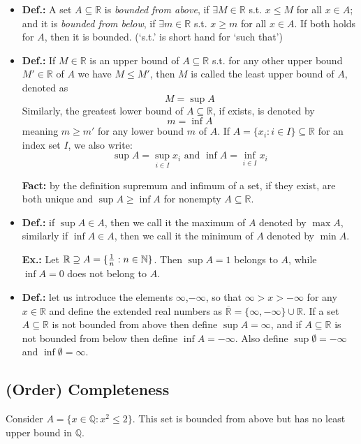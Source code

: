 \documentclass{article}
\begin{document}
\begin{itemize}
\item \textbf{Def.:} A set $A\subseteq \mathbb{R}$ is \textit{bounded} \textit{from above}, if $\exists M\in \mathbb{R}$ s.t.  $x\leq M$ for all $x\in A$; and it is \textit{bounded from below}, if $\exists m\in \mathbb{R}$ s.t.  $x\geq m$ for all $x\in A$. If both holds for $A$, then it is bounded.				(‘s.t.’ is short hand for ‘such that’)

\item \textbf{Def.:} If $M\in \mathbb{R}$ is an upper bound of $A\subseteq \mathbb{R}$ s.t. for any other upper bound $M'\in \mathbb{R}$ of $A$ we have $M\leq M'$, then $M$ is called the least upper bound of $A$, denoted as
\[
M=\sup A
\]
Similarly, the greatest lower bound of $A\subseteq \mathbb{R}$, if exists, is denoted by 
\[
m=\inf A
\]
  meaning $m\geq m'$ for any lower bound $m$ of $A$.
If $A=\{x_i: i\in I\}\subseteq \mathbb{R}$ for an index set $I$, we also write:
\[
\sup A=\sup_{i\in I}x_i \text{ and } \inf A = \inf_{i\in I}x_i
\]

\textbf{Fact:} by the definition supremum and infimum of a set, if they exist, are both unique and $\sup A\geq \inf A$ for nonempty $A\subseteq \mathbb{R}$.

\item \textbf{Def.:} if $\sup A\in A$, then we call it the maximum of $A$ denoted by $\max A$, similarly if $\inf A \in A$, then we call it the minimum of $A$ denoted by $\min A$.

\textbf{Ex.:} Let $\mathbb{R}\supseteq A=\{{1\over n} : n\in \mathbb{N}\}$. Then $\sup A=1$ belongs to $A$, while $\inf A=0$ does not belong to $A$.

\item \textbf{Def.:} let us introduce the elements $\infty$,$-\infty$, so that $\infty >x>-\infty$ for any $x\in \mathbb{R}$ and define the extended real numbers as $\overline{\mathbb{R}}=\{\infty, -\infty\}\cup \mathbb{R}$. If a set $A\subseteq \mathbb{R}$ is not bounded from above then define $\sup A=\infty$, and if $A\subseteq \mathbb{R}$ is not bounded from below then define $\inf A=-\infty$. Also define $\sup \emptyset=-\infty$ and $\inf \emptyset = \infty$.
\end{itemize}

\subsection{(Order) Completeness}

Consider $A=\{x\in \mathbb{Q}:x^2\leq 2\}$. This set is bounded from above but has no least upper bound in $\mathbb{Q}$.
\end{document}
